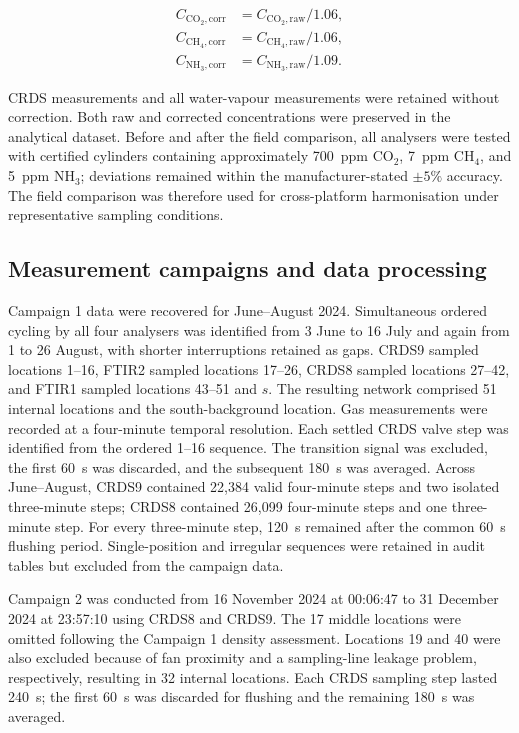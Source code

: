 \documentclass[12pt,a4paper]{article}
\begin{document}
\begin{align}
C_{\mathrm{CO_2,corr}} &= C_{\mathrm{CO_2,raw}}/1.06,\\
C_{\mathrm{CH_4,corr}} &= C_{\mathrm{CH_4,raw}}/1.06,\\
C_{\mathrm{NH_3,corr}} &= C_{\mathrm{NH_3,raw}}/1.09.
\end{align}

CRDS measurements and all water-vapour measurements were retained without
correction. Both raw and corrected concentrations were preserved in the
analytical dataset. Before and after the field comparison, all analysers were
tested with certified cylinders containing approximately \SI{700}{ppm}
\(\mathrm{CO_2}\), \SI{7}{ppm} \(\mathrm{CH_4}\), and \SI{5}{ppm}
\(\mathrm{NH_3}\); deviations remained within the manufacturer-stated
\(\pm 5\%\) accuracy. The field comparison was therefore used for
cross-platform harmonisation under representative sampling conditions.

\subsection{Measurement campaigns and data processing}

Campaign 1 data were recovered for June--August 2024. Simultaneous ordered
cycling by all four analysers was identified from 3 June to 16 July and again
from 1 to 26 August, with shorter interruptions retained as gaps. CRDS9
sampled locations 1--16, FTIR2 sampled locations 17--26,
CRDS8 sampled locations 27--42, and FTIR1 sampled locations 43--51 and \(s\).
The resulting network comprised 51 internal locations and the
south-background location. Gas measurements were recorded at a four-minute
temporal resolution. Each settled CRDS valve step was identified from the
ordered 1--16 sequence. The transition signal was excluded, the first
\SI{60}{s} was discarded, and the subsequent \SI{180}{s} was averaged.
Across June--August, CRDS9 contained 22,384 valid four-minute steps and two
isolated three-minute steps; CRDS8 contained 26,099 four-minute steps and one
three-minute step. For every three-minute step, \SI{120}{s} remained after
the common \SI{60}{s} flushing period. Single-position and irregular
sequences were retained in audit tables but excluded from the campaign data.

Campaign 2 was conducted from 16 November 2024 at 00:06:47 to 31 December
2024 at 23:57:10 using CRDS8 and CRDS9. The 17 middle locations were omitted
following the Campaign 1 density assessment. Locations 19 and 40 were also
excluded because of fan proximity and a sampling-line leakage problem,
respectively, resulting in 32 internal locations. Each CRDS sampling step
lasted \SI{240}{s}; the first \SI{60}{s} was discarded for flushing and the
remaining \SI{180}{s} was averaged.
\end{document}
